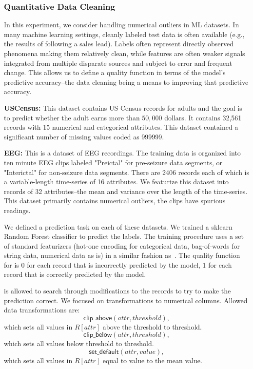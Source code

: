\subsubsection{Quantitative Data Cleaning}
In this experiment, we consider handling numerical outliers in ML datasets.
In many machine learning settings, cleanly labeled test data is often available (e.g., the results of following a sales lead). 
Labels often represent directly observed phenomena making them relatively clean, while features are often weaker signals integrated from multiple disparate sources and subject to error and frequent change.
This allows us to define a quality function in terms of the model's predictive accuracy--the data cleaning being a means to improving that predictive accuracy.

\vspace{0.5em}\noindent\textbf{USCensus: } This dataset contains US Census records for adults and the goal is to predict  whether the adult earns more than $50,000$ dollars. It contains 32,561 records with 15 numerical and categorical attributes. This dataset contained a significant number of missing values coded as 999999.

\vspace{0.5em}\noindent\textbf{EEG: } This is a dataset of EEG recordings. 
The training data is organized into ten minute EEG clips labeled "Preictal" for pre-seizure data segments, or "Interictal" for non-seizure data segments. 
There are 2406 records each of which is a variable-length time-series of 16 attributes. We featurize this dataset into records of 32 attributes--the mean and variance over the length of the time-series. 
This dataset primarily contains numerical outliers, the clips have spurious readings.

\vspace{0.5em}
We defined a prediction task on each of these datasets. We trained a \textsf{sklearn} Random Forest classifier to predict the labels. The training procedure uses a set of standard featurizers (hot-one encoding for categorical data, bag-of-words for string data, numerical data as is) in a similar fashion as~\cite{gokhale2014corleone}. The quality function for \sys is 0 for each record that is incorrectly predicted by the model, 1 for each record that is correctly predicted by the model.

\sys is allowed to search through modifications to the records to try to make the prediction correct. We focused on transformations to numerical columns. Allowed data transformations are:
\[
\textsf{clip\_above}(attr, threshold), 
\]
which sets all values in $R[attr]$ above the threshold to threshold.
\[
\textsf{clip\_below}(attr, threshold), 
\]
which sets all values below threshold to threshold.
\[
\textsf{set\_default}(attr, value), 
\]
which sets all values in $R[attr]$ equal to value to the mean value.


